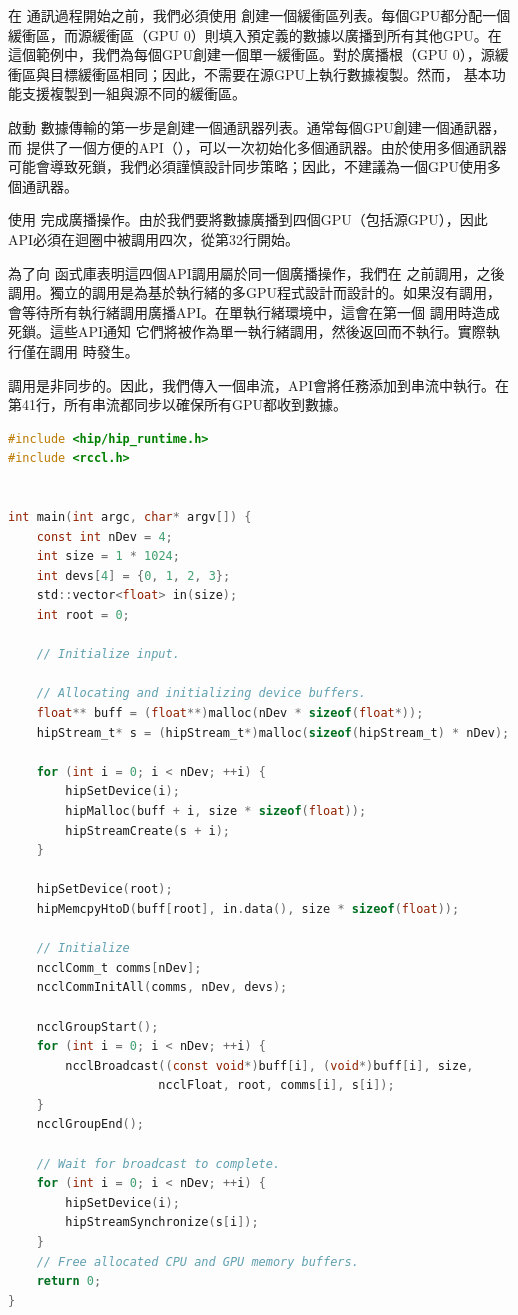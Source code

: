 在 通訊過程開始之前，我們必須使用 創建一個緩衝區列表。每個GPU都分配一個緩衝區，而源緩衝區（GPU 0）則填入預定義的數據以廣播到所有其他GPU。在這個範例中，我們為每個GPU創建一個單一緩衝區。對於廣播根（GPU 0），源緩衝區與目標緩衝區相同；因此，不需要在源GPU上執行數據複製。然而， 基本功能支援複製到一組與源不同的緩衝區。

啟動 數據傳輸的第一步是創建一個通訊器列表。通常每個GPU創建一個通訊器，而 提供了一個方便的API（），可以一次初始化多個通訊器。由於使用多個通訊器可能會導致死鎖，我們必須謹慎設計同步策略；因此，不建議為一個GPU使用多個通訊器。

使用 完成廣播操作。由於我們要將數據廣播到四個GPU（包括源GPU），因此API必須在迴圈中被調用四次，從第32行開始。

為了向 函式庫表明這四個API調用屬於同一個廣播操作，我們在 之前調用，之後調用。獨立的調用是為基於執行緒的多GPU程式設計而設計的。如果沒有調用， 會等待所有執行緒調用廣播API。在單執行緒環境中，這會在第一個 調用時造成死鎖。這些API通知 它們將被作為單一執行緒調用，然後返回而不執行。實際執行僅在調用 時發生。

 調用是非同步的。因此，我們傳入一個串流，API會將任務添加到串流中執行。在第41行，所有串流都同步以確保所有GPU都收到數據。

\begin{lstlisting}[language=C, caption={混合使用\term{MPI} 和\term{RCCL Broadcast}}, captionpos=t, label={lst:mpi_rccl_broadcast}]
#include <hip/hip_runtime.h>
#include <rccl.h>


int main(int argc, char* argv[]) {
    const int nDev = 4;
    int size = 1 * 1024;
    int devs[4] = {0, 1, 2, 3};
    std::vector<float> in(size);
    int root = 0;

    // Initialize input.

    // Allocating and initializing device buffers.
    float** buff = (float**)malloc(nDev * sizeof(float*));
    hipStream_t* s = (hipStream_t*)malloc(sizeof(hipStream_t) * nDev);

    for (int i = 0; i < nDev; ++i) {
        hipSetDevice(i);
        hipMalloc(buff + i, size * sizeof(float));
        hipStreamCreate(s + i);
    }

    hipSetDevice(root);
    hipMemcpyHtoD(buff[root], in.data(), size * sizeof(float));
    
    // Initialize
    ncclComm_t comms[nDev];
    ncclCommInitAll(comms, nDev, devs);
    
    ncclGroupStart();
    for (int i = 0; i < nDev; ++i) {
        ncclBroadcast((const void*)buff[i], (void*)buff[i], size,
                     ncclFloat, root, comms[i], s[i]);
    }
    ncclGroupEnd();
    
    // Wait for broadcast to complete.
    for (int i = 0; i < nDev; ++i) {
        hipSetDevice(i);
        hipStreamSynchronize(s[i]);
    }
    // Free allocated CPU and GPU memory buffers.
    return 0;
}
\end{lstlisting}

